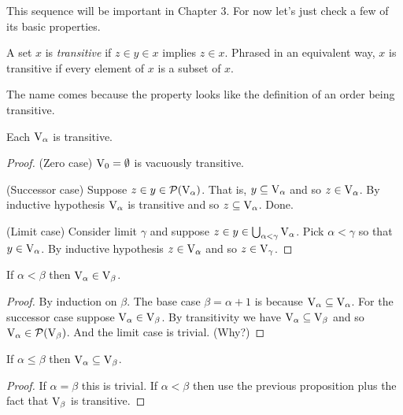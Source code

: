 \documentclass[10pt]{amsart}
\begin{document}
This sequence will be important in Chapter 3. For now let's just check a few of its basic properties.


\begin{definition}
A set $x$ is \emph{transitive} if $z \in y \in x$ implies $z \in x$. Phrased in an equivalent way, $x$ is transitive if every element of $x$ is a subset of $x$.
\end{definition}

The name comes because the property looks like the definition of an order being transitive.

\begin{proposition}
Each $\mathrm{V}_\alpha$ is transitive.
\end{proposition}

\begin{proof}
(Zero case) $\mathrm{V}_0 = \emptyset$ is vacuously transitive.

(Successor case) Suppose $z \in y \in \mathcal{P}(\mathrm{V}_\alpha)$. That is, $y \subseteq \mathrm{V}_\alpha$ and so $z \in \mathrm{V}_\alpha$. By inductive hypothesis $\mathrm{V}_\alpha$ is transitive and so $z \subseteq \mathrm{V}_\alpha$. Done.

(Limit case) Consider limit $\gamma$ and suppose $z \in y \in \bigcup_{\alpha < \gamma} \mathrm{V}_\alpha$. Pick $\alpha < \gamma$ so that $y \in \mathrm{V}_\alpha$. By inductive hypothesis $z \in \mathrm{V}_\alpha$ and so $z \in \mathrm{V}_\gamma$.
\end{proof}

\begin{proposition}
If $\alpha < \beta$ then $\mathrm{V}_\alpha \in \mathrm{V}_\beta$.
\end{proposition}

\begin{proof}
By induction on $\beta$. The base case $\beta = \alpha+1$ is because $\mathrm{V}_\alpha \subseteq \mathrm{V}_\alpha$. For the successor case suppose $\mathrm{V}_\alpha \in \mathrm{V}_\beta$. By transitivity we have $\mathrm{V}_\alpha \subseteq \mathrm{V}_\beta$ and so $\mathrm{V}_\alpha \in \mathcal{P}(\mathrm{V}_\beta)$. And the limit case is trivial. (Why?)
\end{proof}

\begin{corollary}
If $\alpha \le \beta$ then $\mathrm{V}_\alpha \subseteq \mathrm{V}_\beta$.
\end{corollary}

\begin{proof}
If $\alpha = \beta$ this is trivial. If $\alpha < \beta$ then use the previous proposition plus the fact that $\mathrm{V}_\beta$ is transitive.
\end{proof}
\end{document}

